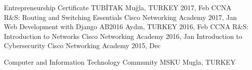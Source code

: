 \begin{cvhonors}
    \cvhonor
        {Entrepreneurship Certificate}
        {TUBİTAK}
        {Muğla, TURKEY}
        {2017, Feb}
    \cvhonor
        {CCNA R\&S: Routing and Switching Essentials}
        {Cisco Networking Academy}
        {}
        {2017, Jan}
    \cvhonor
        {Web Development with Django}
        {AB2016}
        {Aydın, TURKEY}
        {2016, Feb}
    \cvhonor
        {CCNA R\&S: Introduction to Networks}
        {Cisco Networking Academy}
        {}
        {2016, Jan}
    \cvhonor
        {Introduction to Cybersecurity}
        {Cisco Networking Academy}
        {}
        {2015, Dec}
\end{cvhonors}

\begin{cvhonors}
    \cvhonor
        {Computer and Information Technology Community}
        {MSKU}
        {Mugla, TURKEY}
        {}

\end{cvhonors}